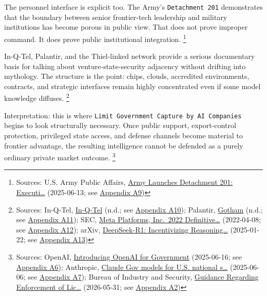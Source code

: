\documentclass[
  american,
  11pt,
  letterpaper,
]{article}
\begin{document}
The personnel interface is explicit too. The Army's
\texttt{Detachment\ 201} demonstrates that the boundary between senior
frontier-tech leadership and military institutions has become porous in
public view. That does not prove improper command. It does prove public
institutional integration. \footnote{Sources: U.S. Army Public Affairs,
  \href{https://www.army.mil/article/286317/army_launches_detachment_201_executive_innovation_corps_to_drive_tech_transformation}{Army
  Launches Detachment 201: Executi\ldots{}} (2025-06-13; see
  \hyperref[appendix-a9-army-launches-detachment-201-executive-innovation-corps-to-drive-tech-transformation]{Appendix
  A9})}

In-Q-Tel, Palantir, and the Thiel-linked network provide a serious
documentary basis for talking about venture-state-security adjacency
without drifting into mythology. The structure is the point: chips,
clouds, accredited environments, contracts, and strategic interfaces
remain highly concentrated even if some model knowledge diffuses.
\footnote{Sources: In-Q-Tel, \href{https://www.iqt.org/}{In-Q-Tel}
  (n.d.; see \hyperref[appendix-a10-in-q-tel]{Appendix A10}); Palantir,
  \href{https://www.palantir.com/platforms/gotham/}{Gotham} (n.d.; see
  \hyperref[appendix-a11-gotham]{Appendix A11}); SEC,
  \href{https://www.sec.gov/Archives/edgar/data/1326801/000132680122000043/meta2022definitiveproxysta.htm}{Meta
  Platforms, Inc.~2022 Definitive\ldots{}} (2022-04-08; see
  \hyperref[appendix-a12-meta-platforms-inc-2022-definitive-proxy-statement]{Appendix
  A12}); arXiv, \href{https://arxiv.org/abs/2501.12948}{DeepSeek-R1:
  Incentivizing Reasoning\ldots{}} (2025-01-22; see
  \hyperref[appendix-a13-deepseek-r1-incentivizing-reasoning-capability-in-llms-via-reinforcement-learning]{Appendix
  A13})}

Interpretation: this is where
\texttt{Limit\ Government\ Capture\ by\ AI\ Companies} begins to look
structurally necessary. Once public support, export-control protection,
privileged state access, and defense channels become material to
frontier advantage, the resulting intelligence cannot be defended as a
purely ordinary private market outcome. \footnote{Sources: OpenAI,
  \href{https://openai.com/global-affairs/introducing-openai-for-government/}{Introducing
  OpenAI for Government} (2025-06-16; see
  \hyperref[appendix-a6-introducing-openai-for-government]{Appendix
  A6}); Anthropic,
  \href{https://www.anthropic.com/news/claude-gov-models-for-u-s-national-security-customers}{Claude
  Gov models for U.S. national s\ldots{}} (2025-06-06; see
  \hyperref[appendix-a7-claude-gov-models-for-u-s-national-security-customers]{Appendix
  A7}); Bureau of Industry and Security,
  \href{https://www.bis.gov/media/documents/bis-guidance-may-31-2026.pdf}{Guidance
  Regarding Enforcement of Lic\ldots{}} (2026-05-31; see
  \hyperref[appendix-a2-guidance-regarding-enforcement-of-license-requirements-for-advanced-computing-items-for-entities-headquartered-in-country-group-d-5-and-macau]{Appendix
  A2})}
\end{document}

